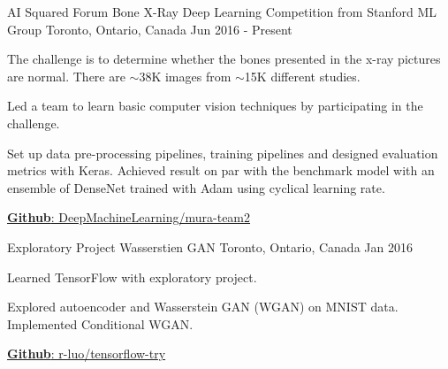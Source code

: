 
\begin{cventries}

  \cventry
    {AI Squared Forum} %
    {Bone X-Ray Deep Learning Competition from Stanford ML Group} %
    {Toronto, Ontario, Canada} %
    {Jun 2016 - Present} %
    {
      \begin{cvitems} %
        \item {The challenge is to determine whether the bones presented in the x-ray pictures are normal. There are $\sim$38K images from $\sim$15K different studies.}
        \item {Led a team to learn basic computer vision techniques by participating in the challenge.}
        \item {Set up data pre-processing pipelines, training pipelines and designed evaluation metrics with Keras. Achieved result on par with the benchmark model with an ensemble of DenseNet trained with Adam using cyclical learning rate.}
        \item \href{https://github.com/DeepMachineLearning/mura-team2}{\textbf{Github}: DeepMachineLearning/mura-team2}
      \end{cvitems}
    }

\end{cventries}

\begin{cventries}

  \cventry
    {Exploratory Project} %
    {Wasserstien GAN} %
    {Toronto, Ontario, Canada} %
    {Jan 2016} %
    {
      \begin{cvitems} %
        \item {Learned TensorFlow with exploratory project.}
        \item {Explored autoencoder and Wasserstein GAN (WGAN) on MNIST data. Implemented Conditional WGAN.}
        \item \href{https://github.com/r-luo/tensorflow-try}{\textbf{Github}: r-luo/tensorflow-try}
      \end{cvitems}
    }

\end{cventries}

